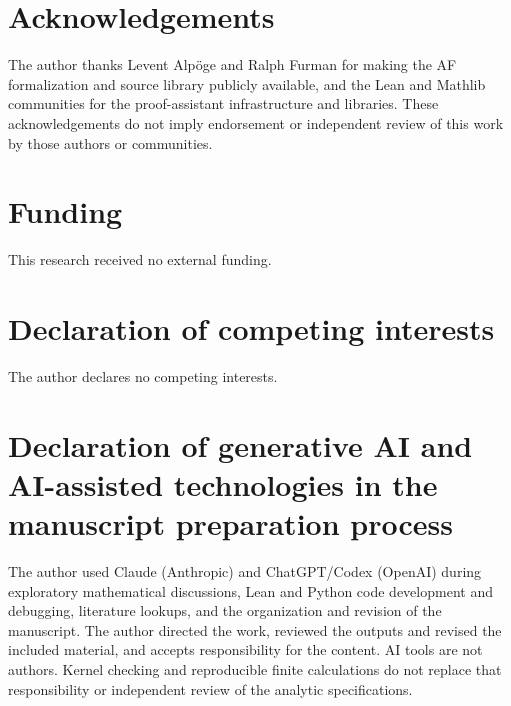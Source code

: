 \documentclass[11pt]{article}
\theoremstyle{definition}
\begin{document}
\section*{Acknowledgements}

The author thanks Levent Alp\"oge and Ralph Furman for making the AF
formalization and source library publicly available, and the Lean and
Mathlib communities for the proof-assistant infrastructure and libraries.
These acknowledgements do not imply endorsement or independent review
of this work by those authors or communities.

\section*{Funding}

This research received no external funding.

\section*{Declaration of competing interests}

The author declares no competing interests.

\section*{Declaration of generative AI and AI-assisted technologies in the manuscript preparation process}

The author used Claude (Anthropic) and ChatGPT/Codex (OpenAI) during
exploratory mathematical discussions, Lean and Python code development
and debugging, literature lookups, and the organization and revision of
the manuscript. The author directed the work, reviewed the outputs and
revised the included material, and accepts responsibility for the content.
AI tools are not authors. Kernel checking and reproducible finite
calculations do not replace that responsibility or independent review
of the analytic specifications.
\end{document}
